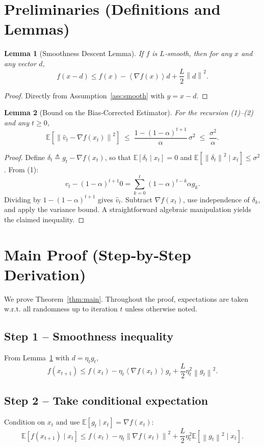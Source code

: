 \documentclass{article}
\newtheorem{lemma}{Lemma}
\newcommand{\EE}{\mathbb{E}}
\newcommand{\norm}[1]{\left\|#1\right\|}
\newcommand{\inner}[1]{\left\langle #1 \right\rangle}
\begin{document}
\newpage

\section*{Preliminaries (Definitions and Lemmas)}
\begin{lemma}[Smoothness Descent Lemma]\label{lem:smooth}
If $f$ is $L$‑smooth, then for any $x$ and any vector $d$,
\[
f(x-d)\le f(x)-\inner{\nabla f(x)}{d}+\frac{L}{2}\norm{d}^2 .
\]
\end{lemma}
\begin{proof}
Directly from Assumption~\ref{ass:smooth} with $y=x-d$.
\end{proof}

\begin{lemma}[Bound on the Bias‑Corrected Estimator]\label{lem:vtbound}
For the recursion (1)–(2) and any $t\ge0$,
\[
\EE\!\left[\norm{\hat v_t-\nabla f(x_t)}^2\right]
\;\le\;
\frac{1-(1-\alpha)^{t+1}}{\alpha}\,\sigma^2
\;\le\;
\frac{\sigma^2}{\alpha}.
\]
\end{lemma}
\begin{proof}
Define $\delta_t\triangleq g_t-\nabla f(x_t)$, so that $\EE[\delta_t\mid x_t]=0$ and $\EE[\norm{\delta_t}^2\mid x_t]\le\sigma^2$.
From (1):
\[
v_t-(1-\alpha)^{t+1}0
= \sum_{k=0}^{t}(1-\alpha)^{t-k}\alpha g_k .
\]
Dividing by $1-(1-\alpha)^{t+1}$ gives $\hat v_t$.
Subtract $\nabla f(x_t)$, use independence of $\delta_k$, and apply the variance bound.
A straightforward algebraic manipulation yields the claimed inequality. \qedhere
\end{proof}

\section*{Main Proof (Step‑by‑Step Derivation)}
We prove Theorem~\ref{thm:main}. Throughout the proof, expectations are taken w.r.t. all randomness up to iteration $t$ unless otherwise noted.

\subsection*{Step 1 – Smoothness inequality}
From Lemma~\ref{lem:smooth} with $d=\eta_t g_t$,
\[
f(x_{t+1})\le f(x_t)-\eta_t\inner{\nabla f(x_t)}{g_t}
+\frac{L}{2}\eta_t^{2}\norm{g_t}^{2}. \tag{5}
\]

\subsection*{Step 2 – Take conditional expectation}
Condition on $x_t$ and use $\EE[g_t\mid x_t]=\nabla f(x_t)$:
\[
\EE\!\left[f(x_{t+1})\mid x_t\right]\le
f(x_t)-\eta_t\norm{\nabla f(x_t)}^{2}
+\frac{L}{2}\eta_t^{2}\EE\!\left[\norm{g_t}^{2}\mid x_t\right].
\tag{6}
\]
\end{document}
